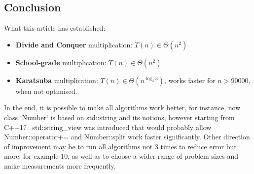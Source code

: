\documentclass[12pt, oneside]{article}
\begin{document}
\subsection{Conclusion}
What this article has established:
\begin{itemize}
\item  \textbf{Divide and Conquer} multiplication:
	$T(n) \in \Theta(n^2)$
\item  \textbf{School-grade} multiplication:
	$T(n) \in \Theta(n^2)$
\item  \textbf{Karatsuba} multiplication:
	$T(n) \in \Theta(n^{\log_2 3})$, works faster for $n>90000$, when not optimised.
\end{itemize}
In the end, it is possible to make all algorithms work better, for instance, now class `Number` is based on std::string and its notions, however starting from C++17 \ std::string\_view was introduced that would probably allow Number::operator+= and Number::split work faster significantly. Other direction of improvement may be to run all algorithms not 3 times to reduce error but more, for example 10, as well as to choose a wider range of problem sizes and make measurements more frequently. 
\end{document}
